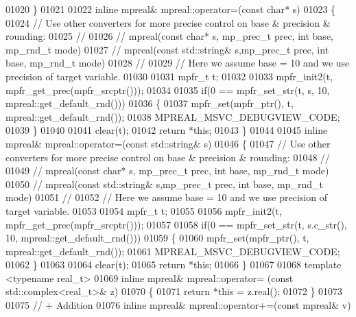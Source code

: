 \begin{DoxyCode}
01020 \}
01021 
01022 \textcolor{keyword}{inline} mpreal& mpreal::operator=(\textcolor{keyword}{const} \textcolor{keywordtype}{char}* s)
01023 \{
01024     \textcolor{comment}{// Use other converters for more precise control on base & precision & rounding:}
01025     \textcolor{comment}{//}
01026     \textcolor{comment}{//        mpreal(const char* s,        mp\_prec\_t prec, int base, mp\_rnd\_t mode)}
01027     \textcolor{comment}{//        mpreal(const std::string& s,mp\_prec\_t prec, int base, mp\_rnd\_t mode)}
01028     \textcolor{comment}{//}
01029     \textcolor{comment}{// Here we assume base = 10 and we use precision of target variable.}
01030 
01031     mpfr\_t t;
01032 
01033     mpfr\_init2(t, mpfr\_get\_prec(mpfr\_srcptr()));
01034 
01035     \textcolor{keywordflow}{if}(0 == mpfr\_set\_str(t, s, 10, mpreal::get\_default\_rnd()))
01036     \{
01037         mpfr\_set(mpfr\_ptr(), t, mpreal::get\_default\_rnd());
01038         MPREAL\_MSVC\_DEBUGVIEW\_CODE;
01039     \}
01040 
01041     clear(t);
01042     \textcolor{keywordflow}{return} *\textcolor{keyword}{this};
01043 \}
01044 
01045 \textcolor{keyword}{inline} mpreal& mpreal::operator=(\textcolor{keyword}{const} std::string& s)
01046 \{
01047     \textcolor{comment}{// Use other converters for more precise control on base & precision & rounding:}
01048     \textcolor{comment}{//}
01049     \textcolor{comment}{//        mpreal(const char* s,        mp\_prec\_t prec, int base, mp\_rnd\_t mode)}
01050     \textcolor{comment}{//        mpreal(const std::string& s,mp\_prec\_t prec, int base, mp\_rnd\_t mode)}
01051     \textcolor{comment}{//}
01052     \textcolor{comment}{// Here we assume base = 10 and we use precision of target variable.}
01053 
01054     mpfr\_t t;
01055 
01056     mpfr\_init2(t, mpfr\_get\_prec(mpfr\_srcptr()));
01057 
01058     \textcolor{keywordflow}{if}(0 == mpfr\_set\_str(t, s.c\_str(), 10, mpreal::get\_default\_rnd()))
01059     \{
01060         mpfr\_set(mpfr\_ptr(), t, mpreal::get\_default\_rnd());
01061         MPREAL\_MSVC\_DEBUGVIEW\_CODE;
01062     \}
01063 
01064     clear(t);
01065     \textcolor{keywordflow}{return} *\textcolor{keyword}{this};
01066 \}
01067 
01068 \textcolor{keyword}{template} <\textcolor{keyword}{typename} real\_t>
01069 \textcolor{keyword}{inline} mpreal& mpreal::operator= (\textcolor{keyword}{const} std::complex<real\_t>& z)
01070 \{
01071     \textcolor{keywordflow}{return} *\textcolor{keyword}{this} = z.real();
01072 \}
01073 
01075 \textcolor{comment}{// + Addition}
01076 \textcolor{keyword}{inline} mpreal& mpreal::operator+=(\textcolor{keyword}{const} mpreal& v)

\end{DoxyCode}
